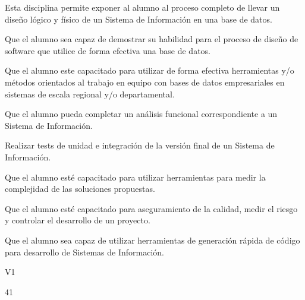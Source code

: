 \begin{syllabus}


\begin{justification}
Esta disciplina permite exponer al alumno al proceso completo de llevar un diseño lógico y físico de un Sistema de Información en una base de datos.
\end{justification}

\begin{goals}
\item Que el alumno sea capaz de demostrar su habilidad para el proceso de diseño de software que utilice de forma efectiva una base de datos.
\item Que el alumno este capacitado para utilizar de forma efectiva herramientas y/o métodos orientados al trabajo en equipo con bases de datos empresariales en sistemas de escala regional y/o departamental.
\item Que el alumno pueda completar un análisis funcional correspondiente a un Sistema de Información.
\item Realizar tests de unidad e integración de la versión final de un Sistema de Información.
\item Que el alumno esté capacitado para utilizar herramientas  para medir la complejidad de las soluciones propuestas.
\item Que el alumno esté capacitado para aseguramiento de la calidad, medir el riesgo y controlar el desarrollo de un proyecto.
\item Que el alumno sea capaz de utilizar herramientas de generación rápida de código para desarrollo de Sistemas de Información.
\end{goals}

\begin{outcomes}{V1}
\end{outcomes}

\begin{unit}{\LUEIGHTSIXDef}{}{\LUEIGHTSIXBib}{4}{1}
   \begin{topics}
	\item \OMCONEOHTopicTWOxONEOHxONE
	\item \OMCONEOHTopicTWOxONEOHxONEOH
	\item \OMCONEOHTopicTWOxONEOHxSIX
	\item \OMCONEOHTopicTWOxONEOHxNINE
	\item \OMCTHREETopicTWOxTHREExFIVE
	\item \OMCFOURTopicTWOxFOURxTHREE
	\item \OMCFOURTopicTWOxFOURxFOUR
	\item \OMCFOURTopicTWOxFOURxFIVE
	\item \OMCFOURTopicTWOxFOURxSIX
	\item \OMCFOURTopicTWOxFOURxSEVEN
	\item \OMCFOURTopicTWOxFOURxEIGHT
   \end{topics}
	\LUEIGHTSIXGoal
\end{unit}


\end{syllabus}
